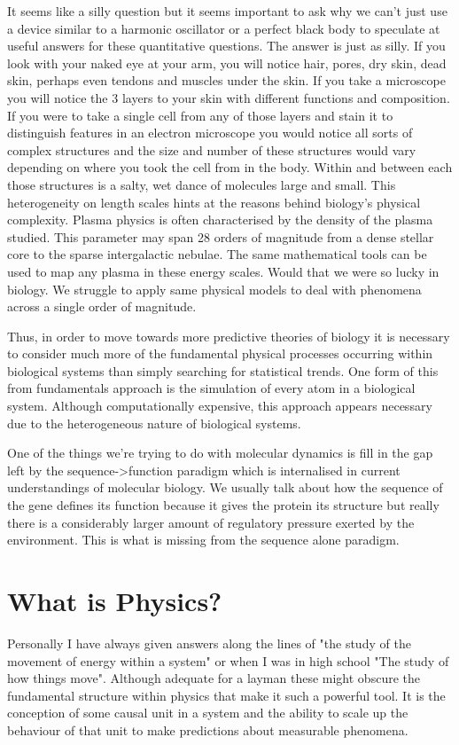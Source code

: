 It seems like a silly question but it seems important to ask why we can't just use a device similar to a harmonic oscillator or a perfect black body to speculate at useful answers for these quantitative questions. The answer is just as silly. If you look with your naked eye at your arm, you will notice hair, pores, dry skin, dead skin, perhaps even tendons and muscles under the skin. If you take a microscope you will notice the 3 layers to your skin with different functions and composition. If you were to take a single cell from any of those layers and stain it to distinguish features in an electron microscope you would notice all sorts of complex structures and the size and number of these structures would vary depending on where you took the cell from in the body. Within and between each those structures is a salty, wet dance of molecules large and small. This heterogeneity on length scales hints at the reasons behind biology's physical complexity. Plasma physics is often characterised by the density of the plasma studied. This parameter may span 28 orders of magnitude from a dense stellar core to the sparse intergalactic nebulae. The same mathematical tools can be used to map any plasma in these energy scales. Would that we were so lucky in biology. We struggle to apply same physical models to deal with phenomena across a single order of magnitude.  


Thus, in order to move towards more predictive theories of biology it is necessary to consider much more of the fundamental physical processes occurring within biological systems than simply searching for statistical trends. One form of this from fundamentals approach is the simulation of every atom in a biological system. Although computationally expensive, this approach appears necessary due to the heterogeneous nature of biological systems. 

One of the things we're trying to do with molecular dynamics is fill in the gap left by the sequence->function paradigm which is internalised in current understandings of molecular biology. We usually talk about how the sequence of the gene defines its function because it gives the protein its structure but really there is a considerably larger amount of regulatory pressure exerted by the environment. This is what is missing from the sequence alone paradigm.

\section{What is Physics?}
Personally I have always given answers along the lines of "the study of the movement of energy within a system" or when I was in high school "The study of how things move". Although adequate for a layman these might obscure the fundamental structure within physics that make it such a powerful tool. It is the conception of some causal unit in a system and the ability to scale up the behaviour of that unit to make predictions about measurable phenomena.

